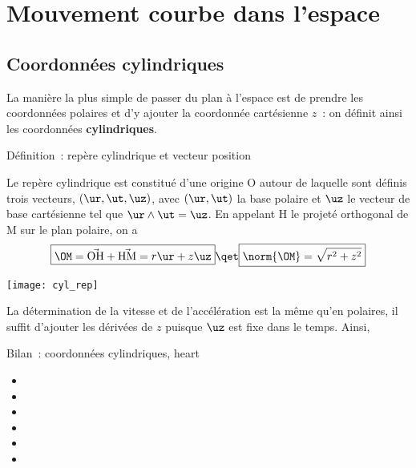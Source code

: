 \documentclass[../main/main.tex]{subfiles}
\begin{document}
\section{Mouvement courbe dans l'espace}
\subsection{Coordonnées cylindriques}

La manière la plus simple de passer du plan à l'espace est de prendre les
coordonnées polaires et d'y ajouter la coordonnée cartésienne $z$~: on définit
ainsi les coordonnées \textbf{cylindriques}.

\begin{tdefi}{Définition~: repère cylindrique et vecteur position}
    \begin{minipage}{0.70\linewidth}
        Le repère cylindrique est constitué d'une origine O autour de laquelle sont
        définis trois vecteurs, $(\ur,\ut,\uz)$, avec $(\ur,\ut)$ la base polaire et
        $\uz$ le vecteur de base cartésienne tel que $\ur \wedge \ut = \uz$. En
        appelant H le projeté orthogonal de M sur le plan polaire, on a
        \[
            \boxed{\OM = \vec{\rm OH} + \vec{\rm HM} = r\ur + z\uz}
            \qet
            \boxed{\norm{\OM} = \sqrt{r^2 + z^2}}
        \]
    \end{minipage}
    \hfill
    \begin{minipage}{0.25\linewidth}
        \begin{center}
            \texttt{[image: cyl\_rep]}
        \end{center}
    \end{minipage}
\end{tdefi}

La détermination de la vitesse et de l'accélération est la même qu'en polaires,
il suffit d'ajouter les dérivées de $z$ puisque $\uz$ est fixe dans le temps.
Ainsi,

\begin{tror}{Bilan~: coordonnées cylindriques, heart}
    \begin{itemize}
        \item {}
        \item {}
        \item {}
        \item {}
        \item {}
        \item {}
    \end{itemize}
\end{tror}
\end{document}
